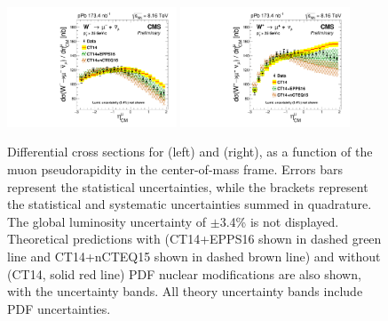 \begin{figure}[htbp]
 \begin{center}
  \includegraphics[width=0.45\textwidth]{Figures/WBoson/Results/Theory/Cross_Section/gr_WToMuMi_PA_Cross_Section_EffTnP_NominalWithTheory_EPPS16.pdf}
  \includegraphics[width=0.45\textwidth]{Figures/WBoson/Results/Theory/Cross_Section/gr_WToMuPl_PA_Cross_Section_EffTnP_NominalWithTheory_EPPS16.pdf}
 \end{center}
 \caption{Differential cross sections for \WToMuNuPl (left) and \WToMuNuMi (right), as a function of the muon pseudorapidity in the center-of-mass frame. Errors bars represent the statistical uncertainties, while the brackets represent the statistical and systematic uncertainties summed in quadrature. The global luminosity uncertainty of $\pm$3.4\% is not displayed. Theoretical predictions with (CT14+EPPS16 shown in dashed green line and CT14+nCTEQ15 shown in dashed brown line) and without (CT14, solid red line) PDF nuclear modifications are also shown, with the uncertainty bands. All theory uncertainty bands include PDF uncertainties. }
 \label{fig:CrossSection_WToMu_PA_Model}
\end{figure}


